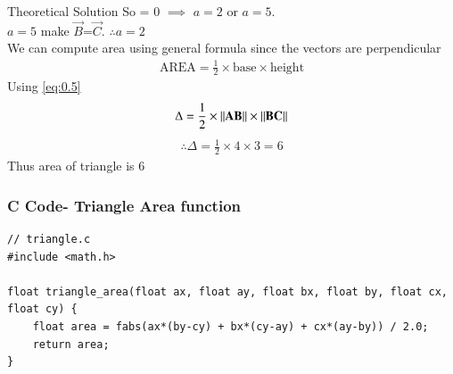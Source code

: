 \documentclass{beamer}
\begin{document}
\begin{frame}{Theoretical Solution}
	So  = 0 $\implies$ $a = 2$ or $a = 5$.\\
$a = 5$ make $\vec{B}$=$\vec{C}$. $\therefore a =2$  \\
We can compute area using general formula since the vectors are perpendicular
\begin{align}
	\text{AREA} = \frac{1}{2}\times\text{base}\times\text{height} \label{eq:0.5}
\end{align}
Using \eqref{eq:0.5}
\begin{align}
	\Delta = \frac{1}{2}\times\left\lVert\mathbf{AB}\right\rVert\times\left\lVert\mathbf{BC}\right\rVert
\end{align}
\begin{align}
	\therefore	\Delta = \frac{1}{2}\times4\times3 = 6
\end{align}
Thus area of triangle is 6\\

	\end{frame}

	\begin{frame}[fragile]
	\frametitle{C Code- Triangle Area function }
	
	\begin{lstlisting}
// triangle.c
#include <math.h>

float triangle_area(float ax, float ay, float bx, float by, float cx, float cy) {
	float area = fabs(ax*(by-cy) + bx*(cy-ay) + cx*(ay-by)) / 2.0;
	return area;
}
	\end{lstlisting}
\end{frame}
\end{document}
